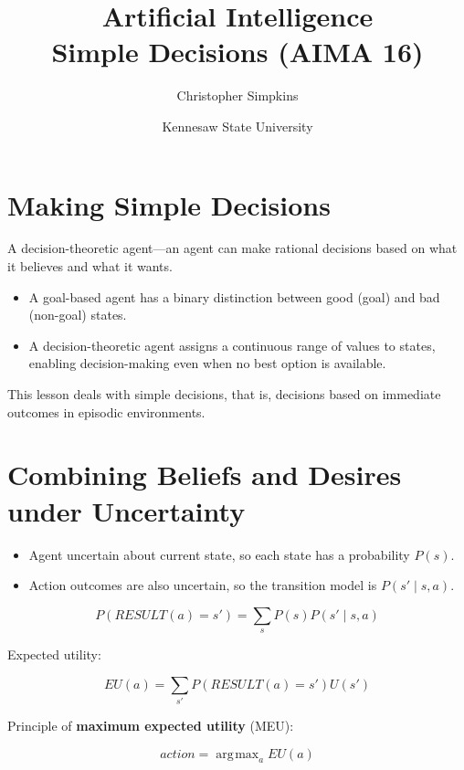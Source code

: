\documentclass[11pt]{article}
\author{Christopher Simpkins}
\date{Kennesaw State University}
\title{Artificial Intelligence\\\medskip
\large Simple Decisions (AIMA 16)}
\DeclareMathOperator*{\argmax}{arg\!max}
\begin{document}
\maketitle
\section{Making Simple Decisions}
\label{sec:orgcc48364}

A decision-theoretic agent—an agent can make rational decisions based on what it believes and what it wants.

\begin{itemize}
\item A goal-based agent has a binary distinction between good (goal) and bad (non-goal) states.

\item A decision-theoretic agent assigns a continuous range of values to states, enabling decision-making even when no best option is available.
\end{itemize}

This lesson deals with simple decisions, that is, decisions based on immediate outcomes in episodic environments.
\section{Combining Beliefs and Desires under Uncertainty}
\label{sec:org9b8116f}

\begin{itemize}
\item Agent uncertain about current state, so each state has a probability \(P(s)\).

\item Action outcomes are also uncertain, so the transition model is \(P(s' \mid s, a)\).
\end{itemize}

\begin{equation*}
P(RESULT(a) = s') = \sum_s P(s) P(s' \mid s, a)
\end{equation*}

Expected utility:

\begin{equation*}
EU(a) = \sum_{s'} P(RESULT(a) = s') U(s') \tag{16.1}
\end{equation*}

Principle of \textbf{maximum expected utility} (MEU):

\begin{equation*}
action = \argmax_a EU(a)
\end{equation*}
\end{document}
